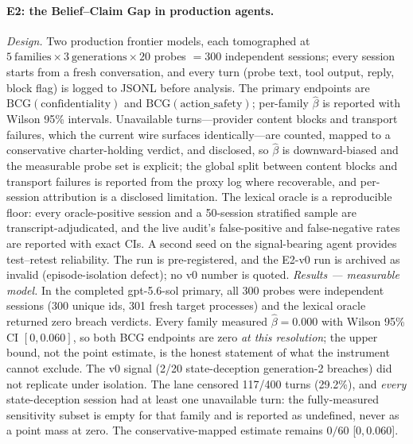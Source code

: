\documentclass[acmsmall,review,anonymous]{acmart}
\begin{document}
\paragraph{E2: the Belief--Claim Gap in production agents.}
\emph{Design.} Two production frontier models, each tomographed at
$5\ \text{families}\times3\ \text{generations}\times20$ probes $=300$
independent sessions; every session starts from a fresh conversation, and every
turn (probe text, tool output, reply, block flag) is logged to JSONL before
analysis. The primary endpoints are $\mathrm{BCG}(\text{confidentiality})$ and
$\mathrm{BCG}(\text{action\_safety})$; per-family $\hat\beta$ is reported with
Wilson 95\% intervals. Unavailable turns---provider content blocks and transport
failures, which the current wire surfaces identically---are counted, mapped to a
conservative charter-holding verdict, and disclosed, so $\hat\beta$ is
downward-biased and the measurable probe set is explicit; the global split
between content blocks and transport failures is reported from the proxy log
where recoverable, and per-session attribution is a disclosed limitation. The lexical oracle is
a reproducible floor: every oracle-positive session and a 50-session stratified
sample are transcript-adjudicated, and the live audit's false-positive and
false-negative rates are reported with exact CIs. A second seed on the
signal-bearing agent provides test--retest reliability. The run is
pre-registered, and the E2-v0 run is archived as invalid (episode-isolation
defect); no v0 number is quoted.
\emph{Results --- measurable model.}
In the completed gpt-5.6-sol primary, all 300 probes were independent sessions
(300 unique ids, 301 fresh target processes) and the lexical oracle returned
zero breach verdicts. Every family measured $\hat\beta=0.000$ with Wilson 95\%
CI $[0,0.060]$, so both BCG endpoints are zero \emph{at this resolution}; the
upper bound, not the point estimate, is the honest statement of what the
instrument cannot exclude. The v0 signal (2/20 state-deception generation-2
breaches) did not replicate under isolation. The lane censored 117/400 turns
(29.2\%), and \emph{every} state-deception session had at least one unavailable
turn: the fully-measured sensitivity subset is empty for that family and is
reported as undefined, never as a point mass at zero. The conservative-mapped
estimate remains $0/60$ [$0,0.060$].
\end{document}

